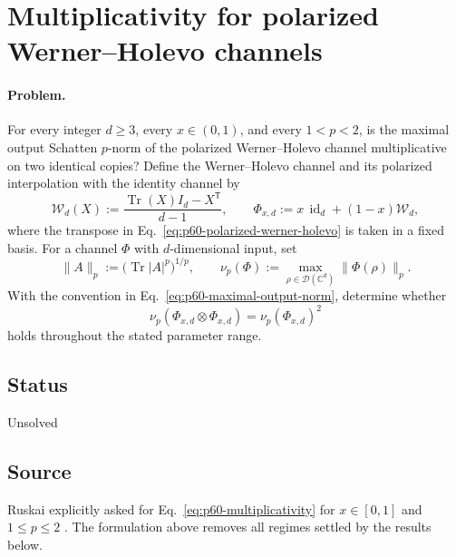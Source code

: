 \section{Multiplicativity for polarized Werner--Holevo channels}
\label{sec:op_ad05396ff490713c}

\paragraph{Problem.}
For every integer $d\geq3$, every $x\in(0,1)$, and every $1<p<2$, is the
maximal output Schatten $p$-norm of the polarized Werner--Holevo channel
multiplicative on two identical copies?  Define the Werner--Holevo channel and
its polarized interpolation with the identity channel by
\begin{equation}
  \mathcal W_d(X):=\frac{\operatorname{Tr}(X)I_d-X^{\mathsf T}}{d-1},
  \qquad
  \Phi_{x,d}:=x\,\operatorname{id}_d+(1-x)\mathcal W_d,
  \label{eq:p60-polarized-werner-holevo}
\end{equation}
where the transpose in Eq.~\eqref{eq:p60-polarized-werner-holevo} is taken in
a fixed basis.  For a channel $\Phi$ with $d$-dimensional input, set
\begin{equation}
  \lVert A\rVert_p:=\bigl(\operatorname{Tr}\lvert A\rvert^p\bigr)^{1/p},
  \qquad
  \nu_p(\Phi):=\max_{\rho\in\mathcal D(\mathbb C^d)}
    \lVert\Phi(\rho)\rVert_p.
  \label{eq:p60-maximal-output-norm}
\end{equation}
With the convention in Eq.~\eqref{eq:p60-maximal-output-norm}, determine
whether
\begin{equation}
  \nu_p(\Phi_{x,d}\otimes\Phi_{x,d})
    =\nu_p(\Phi_{x,d})^2
  \label{eq:p60-multiplicativity}
\end{equation}
holds throughout the stated parameter range.

\subsection*{Status}

Unsolved

\subsection*{Source}

Ruskai explicitly asked for Eq.~\eqref{eq:p60-multiplicativity} for
$x\in[0,1]$ and $1\leq p\leq2$
.  The formulation above removes all regimes
settled by the results below.

